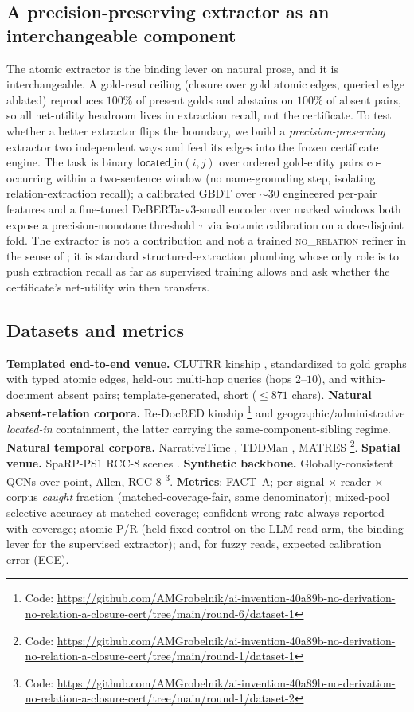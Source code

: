 \documentclass[11pt,letterpaper]{article}
\begin{document}
\subsection{A precision-preserving extractor as an interchangeable component}

The atomic extractor is the binding lever on natural prose, and it is interchangeable. A gold-read ceiling (closure over gold atomic edges, queried edge ablated) reproduces $100\%$ of present golds and abstains on $100\%$ of absent pairs, so all net-utility headroom lives in extraction recall, not the certificate. To test whether a better extractor flips the boundary, we build a \emph{precision-preserving} extractor two independent ways and feed its edges into the frozen certificate engine. The task is binary $\textsf{located\_in}(i,j)$ over ordered gold-entity pairs co-occurring within a two-sentence window (no name-grounding step, isolating relation-extraction recall); a calibrated GBDT \citep{Ke2017} over ${\sim}30$ engineered per-pair features and a fine-tuned DeBERTa-v3-small encoder \citep{He2021} over marked windows both expose a precision-monotone threshold $\tau$ via isotonic calibration on a doc-disjoint fold. The extractor is not a contribution and not a trained \textsc{no\_relation} refiner in the sense of \citet{Yang2025DEPTH}; it is standard structured-extraction plumbing whose only role is to push extraction recall as far as supervised training allows and ask whether the certificate's net-utility win then transfers.

\subsection{Datasets and metrics}

\textbf{Templated end-to-end venue.} CLUTRR kinship \citep{Sinha2019}, standardized to gold graphs with typed atomic edges, held-out multi-hop queries (hops $2$--$10$), and within-document absent pairs; template-generated, short ($\leq 871$ chars). \textbf{Natural absent-relation corpora.} Re-DocRED \citep{Tan2022} kinship \footnote{Code: \url{https://github.com/AMGrobelnik/ai-invention-40a89b-no-derivation-no-relation-a-closure-cert/tree/main/round-6/dataset-1}} and geographic/administrative \emph{located-in} containment, the latter carrying the same-component-sibling regime. \textbf{Natural temporal corpora.} NarrativeTime \citep{Rogers2019, Cassidy2014}, TDDMan \citep{Naik2019}, MATRES \citep{Ning2018} \footnote{Code: \url{https://github.com/AMGrobelnik/ai-invention-40a89b-no-derivation-no-relation-a-closure-cert/tree/main/round-1/dataset-1}}. \textbf{Spatial venue.} SpaRP-PS1 RCC-8 scenes \citep{Mirzaee2022}. \textbf{Synthetic backbone.} Globally-consistent QCNs over point, Allen, RCC-8 \footnote{Code: \url{https://github.com/AMGrobelnik/ai-invention-40a89b-no-derivation-no-relation-a-closure-cert/tree/main/round-1/dataset-2}}. \textbf{Metrics}: FACT~A; per-signal $\times$ reader $\times$ corpus \emph{caught} fraction (matched-coverage-fair, same denominator); mixed-pool selective accuracy at matched coverage; confident-wrong rate always reported with coverage; atomic P/R (held-fixed control on the LLM-read arm, the binding lever for the supervised extractor); and, for fuzzy reads, expected calibration error (ECE).
\end{document}
